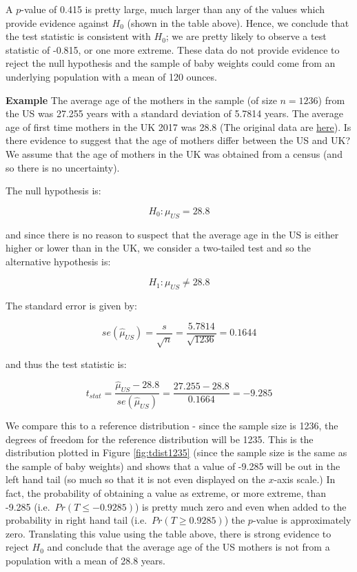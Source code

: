 \documentclass[
  oneside]{krantz}
\begin{document}
A \(p\)-value of 0.415 is pretty large, much larger than any of the values which provide evidence against \(H_0\) (shown in the table above). Hence, we conclude that the test statistic is consistent with \(H_0\); we are pretty likely to observe a test statistic of -0.815, or one more extreme. These data do not provide evidence to reject the null hypothesis and the sample of baby weights could come from an underlying population with a mean of 120 ounces.

\textbf{Example} The average age of the mothers in the sample (of size \(n=1236\)) from the US was 27.255 years with a standard deviation of 5.7814 years. The average age of first time mothers in the UK 2017 was 28.8 (The original data are \href{https://www.ons.gov.uk/peoplepopulationandcommunity/birthsdeathsandmarriages/livebirths/bulletins/birthcharacteristicsinenglandandwales/2017.html}{here}). Is there evidence to suggest that the age of mothers differ between the US and UK? We assume that the age of mothers in the UK was obtained from a census (and so there is no uncertainty).

The null hypothesis is:

\[H_0: \mu_{US} = 28.8\]

and since there is no reason to suspect that the average age in the US is either higher or lower than in the UK, we consider a two-tailed test and so the alternative hypothesis is:

\[H_1: \mu_{US} \ne 28.8\]

The standard error is given by:

\[se(\hat \mu_{US}) = \frac{s}{\sqrt{n}} = \frac{5.7814}{\sqrt{1236}} = 0.1644\]

and thus the test statistic is:

\[ t_{stat} = \frac{\hat \mu_{US} - 28.8}{se(\hat \mu_{US})} = \frac{27.255 - 28.8}{0.1664} = -9.285\]

We compare this to a reference distribution - since the sample size is 1236, the degrees of freedom for the reference distribution will be 1235. This is the distribution plotted in Figure \ref{fig:tdist1235} (since the sample size is the same as the sample of baby weights) and shows that a value of -9.285 will be out in the left hand tail (so much so that it is not even displayed on the \(x\)-axis scale.) In fact, the probability of obtaining a value as extreme, or more extreme, than -9.285 (i.e.~\(Pr(T \le -0.9285)\)) is pretty much zero and even when added to the probability in right hand tail (i.e.~\(Pr(T \ge 0.9285)\)) the \(p\)-value is approximately zero. Translating this value using the table above, there is strong evidence to reject \(H_0\) and conclude that the average age of the US mothers is not from a population with a mean of 28.8 years.
\end{document}
